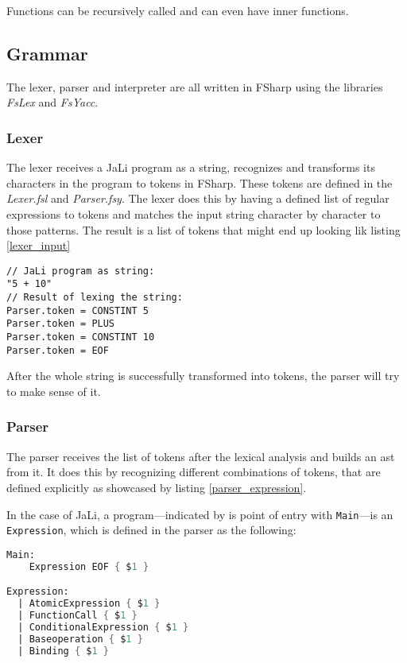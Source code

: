 Functions can be recursively called and can even have inner functions.

\subsection{Grammar}\label{Grammar}
The lexer, parser and interpreter are all written in FSharp using the libraries \textit{FsLex} and \textit{FsYacc}.

\subsubsection{Lexer}
The lexer receives a JaLi program as a string, recognizes and transforms its characters in the program to tokens in FSharp. These tokens are defined in the \textit{Lexer.fsl} and \textit{Parser.fsy}. The lexer does this by having a defined list of regular expressions to tokens and matches the input string character by character to those patterns.
The result is a list of tokens that might end up looking lik listing \ref{lexer_input}

\begin{lstlisting}[columns=fullflexible, label={lexer_input}, language=JaLi, caption=Lexer result]
// JaLi program as string:
"5 + 10"
// Result of lexing the string:
Parser.token = CONSTINT 5
Parser.token = PLUS
Parser.token = CONSTINT 10
Parser.token = EOF
\end{lstlisting}

After the whole string is successfully transformed into tokens, the parser will try to make sense of it.

\subsubsection{Parser}
The parser receives the list of tokens after the lexical analysis and builds an \gls{ast} from it. It does this by recognizing different combinations of tokens, that are defined explicitly as showcased by listing \ref{parser_expression}.

In the case of JaLi, a program---indicated by is point of entry with \texttt{Main}---is an \texttt{Expression}, which is defined in the parser as the following:

\begin{lstlisting}[columns=fullflexible, label={parser_expression}, language=FSharp, caption=Program defined by \texttt{Expression}]
Main:
    Expression EOF { $1 }

Expression:
  | AtomicExpression { $1 }
  | FunctionCall { $1 }
  | ConditionalExpression { $1 }
  | Baseoperation { $1 }
  | Binding { $1 }
\end{lstlisting}

